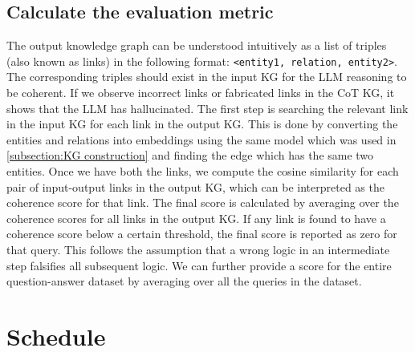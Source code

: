 \documentclass[11pt,a4paper]{article}
\begin{document}
\subsection{Calculate the evaluation metric}
The output knowledge graph can be understood intuitively as a list of triples (also known as links) in the following format: \texttt{<entity1, relation, entity2>}. The corresponding triples should exist in the input KG for the LLM reasoning to be coherent. If we observe incorrect links or fabricated links in the CoT KG, it shows that the LLM has hallucinated. The first step is searching the relevant link in the input KG for each link in the output KG. This is done by converting the entities and relations into embeddings using the same model which was used in \ref{subsection:KG construction} and finding the edge which has the same two entities. Once we have both the links, we compute the cosine similarity for each pair of input-output links in the output KG, which can be interpreted as the coherence score for that link. The final score is calculated by averaging over the coherence scores for all links in the output KG. If any link is found to have a coherence score below a certain threshold, the final score is reported as zero for that query. This follows the assumption that a wrong logic in an intermediate step falsifies all subsequent logic. We can further provide a score for the entire question-answer dataset by averaging over all the queries in the dataset.

\section{Schedule}
\end{document}
